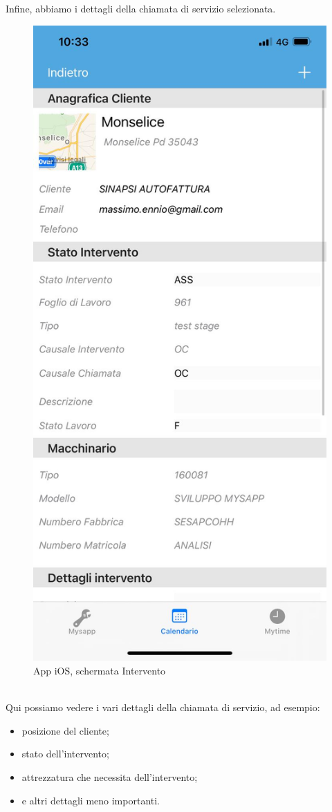 \newpage
Infine, abbiamo i dettagli della chiamata di servizio selezionata.\\
\begin{figure}[!h] 
	\centering 
	\includegraphics[scale = 0.2]{immagini/app iOS/intervento-iOS.jpeg} 
	\caption {App iOS, schermata Intervento}
\end{figure}
\\Qui possiamo vedere i vari dettagli della chiamata di servizio, ad esempio:
\begin{itemize}
	\item posizione del cliente;
	\item stato dell'intervento;
	\item attrezzatura che necessita dell'intervento;
	\item e altri dettagli meno importanti.
\end{itemize}
\newpage
